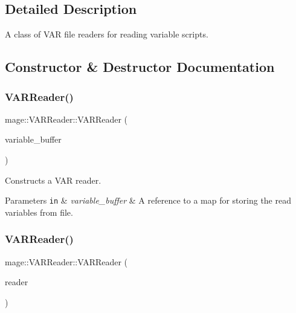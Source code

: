 \subsection{Detailed Description}
A class of V\+AR file readers for reading variable scripts. 

\subsection{Constructor \& Destructor Documentation}
\hypertarget{classmage_1_1_v_a_r_reader_a6da616aa299231ef6a61fe8de536a342}{}\label{classmage_1_1_v_a_r_reader_a6da616aa299231ef6a61fe8de536a342} 
\subsubsection{\texorpdfstring{V\+A\+R\+Reader()}{VARReader()}\hspace{0.1cm}{\footnotesize\ttfamily [1/3]}}
{\footnotesize\ttfamily mage\+::\+V\+A\+R\+Reader\+::\+V\+A\+R\+Reader (\begin{DoxyParamCaption}\item[{map$<$ string, \hyperlink{namespacemage_aa1fe0628487e0706e44efdc62dbdb3a2}{Value} $>$ \&}]{variable\+\_\+buffer }\end{DoxyParamCaption})\hspace{0.3cm}{\ttfamily [explicit]}}

Constructs a V\+AR reader.


\begin{DoxyParams}[1]{Parameters}
\mbox{\tt in}  & {\em variable\+\_\+buffer} & A reference to a map for storing the read variables from file. \\
\hline
\end{DoxyParams}
\hypertarget{classmage_1_1_v_a_r_reader_a42faf193700b82813727aa943ded3940}{}\label{classmage_1_1_v_a_r_reader_a42faf193700b82813727aa943ded3940} 
\subsubsection{\texorpdfstring{V\+A\+R\+Reader()}{VARReader()}\hspace{0.1cm}{\footnotesize\ttfamily [2/3]}}
{\footnotesize\ttfamily mage\+::\+V\+A\+R\+Reader\+::\+V\+A\+R\+Reader (\begin{DoxyParamCaption}\item[{const \hyperlink{classmage_1_1_v_a_r_reader}{V\+A\+R\+Reader} \&}]{reader }\end{DoxyParamCaption})\hspace{0.3cm}{\ttfamily [delete]}}

